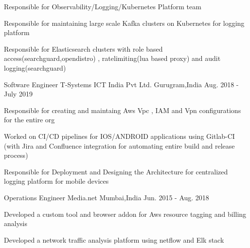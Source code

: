 \begin{cventries}
{\begin{cvitems}
	             \item { Responsible for Observability/Logging/Kubernetes Platform team }
               \item { Responsible for maintaining large scale Kafka clusters on Kubernetes for logging platform}
               \item { Responsible for Elasticsearch clusters with role based access(searchguard,opendistro) , ratelimiting(lua based proxy) and audit logging(searchguard)} 		
	  \end{cvitems}
    }
    \cventry
    {Software Engineer} %
    {T-Systems ICT India Pvt Ltd.} %
    {Gurugram,India} %
    {Aug. 2018 - July 2019} %
    {
      \begin{cvitems} %
	  \item { Responsible for creating and maintaing Aws Vpc , IAM and Vpn configurations for the entire org}
		\item {Worked on CI/CD pipelines for IOS/ANDROID applications using Gitlab-CI (with Jira and Confluence integration for automating entire build and release process)}
		\item  { Responsible for Deployment and Designing the  Architecture for centralized logging platform for mobile devices}                  
	  \end{cvitems}
    }

  \cventry
    {Operations Engineer} %
    {Media.net} %
    {Mumbai,India} %
    {Jun. 2015 - Aug. 2018} %
    {
      \begin{cvitems} %
	    \item {Developed a custom tool and browser addon for Aws resource tagging and billing analysis }
		  \item {Developed a network traffic analysis platform using netflow and Elk stack }
      \end{cvitems}
    }

\end{cventries}
